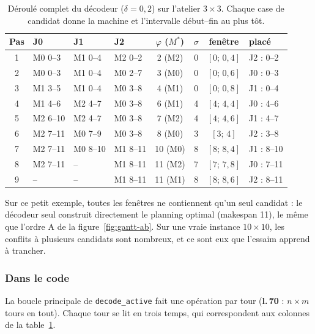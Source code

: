 \documentclass[11pt,a4paper]{article}
\newcommand{\li}[1]{\textcolor{jzero}{\textbf{l.\,#1}}}
\begin{document}
\begin{table}[h]
\centering
\caption{Déroulé complet du décodeur ($\delta=0{,}2$) sur l'atelier $3\times3$. Chaque
case de candidat donne la machine et l'intervalle début--fin au plus tôt.}
\label{tab:trace}
\footnotesize
\setlength{\tabcolsep}{4pt}
\begin{tabular}{c l l l c c c l}
\toprule
Pas & \textcolor{jzero}{J0} & \textcolor{jun}{J1} & \textcolor{jdeux}{J2} & $\varphi$ ($M^*$) & $\sigma$ & fenêtre & placé\\
\midrule
1 & M0 0--3  & M1 0--4  & M2 0--2  & 2 (M2)  & 0 & $[0;\,0{,}4]$ & J2 : 0--2\\
2 & M0 0--3  & M1 0--4  & M0 2--7  & 3 (M0)  & 0 & $[0;\,0{,}6]$ & J0 : 0--3\\
3 & M1 3--5  & M1 0--4  & M0 3--8  & 4 (M1)  & 0 & $[0;\,0{,}8]$ & J1 : 0--4\\
4 & M1 4--6  & M2 4--7  & M0 3--8  & 6 (M1)  & 4 & $[4;\,4{,}4]$ & J0 : 4--6\\
5 & M2 6--10 & M2 4--7  & M0 3--8  & 7 (M2)  & 4 & $[4;\,4{,}6]$ & J1 : 4--7\\
6 & M2 7--11 & M0 7--9  & M0 3--8  & 8 (M0)  & 3 & $[3;\,4]$     & J2 : 3--8\\
7 & M2 7--11 & M0 8--10 & M1 8--11 & 10 (M0) & 8 & $[8;\,8{,}4]$ & J1 : 8--10\\
8 & M2 7--11 & --       & M1 8--11 & 11 (M2) & 7 & $[7;\,7{,}8]$ & J0 : 7--11\\
9 & --       & --       & M1 8--11 & 11 (M1) & 8 & $[8;\,8{,}6]$ & J2 : 8--11\\
\bottomrule
\end{tabular}
\end{table}

Sur ce petit exemple, toutes les fenêtres ne contiennent qu'un seul candidat : le
décodeur seul construit directement le planning optimal (makespan 11), le même que
l'ordre A de la figure~\ref{fig:gantt-ab}. Sur une vraie instance $10\times10$, les
conflits à plusieurs candidats sont nombreux, et ce sont eux que l'essaim apprend à
trancher.

\subsubsection*{Dans le code}

La boucle principale de \texttt{decode\_active} fait une opération par tour
(\li{70} : $n\times m$ tours en tout). Chaque tour se lit en trois temps, qui
correspondent aux colonnes de la table~\ref{tab:trace}.
\end{document}
